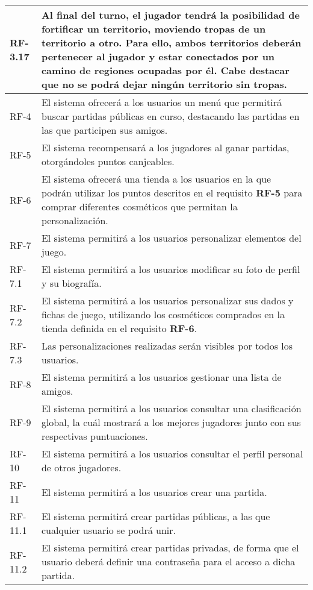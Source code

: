 \documentclass[11pt, a4paper, titlepage]{article}
\begin{document}
\begin{longtable}[h!]{| p{} | p{} |}
         \hline
         RF-3.17 & Al final del turno, el jugador tendrá la posibilidad de fortificar un territorio, moviendo tropas de un territorio a otro. Para ello, ambos territorios deberán pertenecer al jugador y estar conectados por un camino de regiones ocupadas por él. Cabe destacar que no se podrá dejar ningún territorio sin tropas.\\
         \hline
         RF-4 & El sistema ofrecerá a los usuarios un menú que permitirá buscar partidas públicas en curso, destacando las partidas en las que participen sus amigos.\\
         \hline
         RF-5 & El sistema recompensará a los jugadores al ganar partidas, otorgándoles puntos canjeables.\\
         \hline
         RF-6 & El sistema ofrecerá una tienda a los usuarios en la que podrán utilizar los puntos descritos en el requisito \textbf{RF-5} para comprar diferentes cosméticos que permitan la personalización. \\
         \hline
         RF-7 & El sistema permitirá a los usuarios personalizar elementos del juego.\\
         \hline
         RF-7.1 & El sistema permitirá a los usuarios modificar su foto de perfil y su biografía.\\
         \hline
         RF-7.2 & El sistema permitirá a los usuarios personalizar sus dados y fichas de juego, utilizando los cosméticos comprados en la tienda definida en el requisito \textbf{RF-6}.\\
         \hline
         RF-7.3 & Las personalizaciones realizadas serán visibles por todos los usuarios.\\
         \hline
         RF-8 & El sistema permitirá a los usuarios gestionar una lista de amigos.\\
         \hline
         RF-9 & El sistema permitirá a los usuarios consultar una clasificación global, la cuál mostrará a los mejores jugadores junto con sus respectivas puntuaciones.\\
         \hline
         RF-10 & El sistema permitirá a los usuarios consultar el perfil personal de otros jugadores.\\
         \hline
         RF-11 & El sistema permitirá a los usuarios crear una partida.\\
         \hline
         RF-11.1 & El sistema permitirá crear partidas públicas, a las que cualquier usuario se podrá unir.\\
         \hline
         RF-11.2 & El sistema permitirá crear partidas privadas, de forma que el usuario deberá definir una contraseña para el acceso a dicha partida.\\

\end{longtable}
\end{document}
